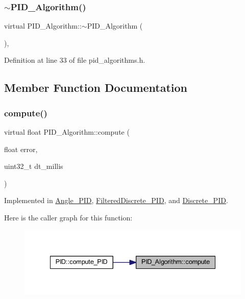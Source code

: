 \subsubsection{\texorpdfstring{$\sim$PID\_Algorithm()}{~PID\_Algorithm()}}
{\footnotesize\ttfamily virtual P\+I\+D\+\_\+\+Algorithm\+::$\sim$\+P\+I\+D\+\_\+\+Algorithm (\begin{DoxyParamCaption}{ }\end{DoxyParamCaption})\hspace{0.3cm}{\ttfamily [inline]}, {\ttfamily [virtual]}}



Definition at line 33 of file pid\+\_\+algorithms.\+h.



\subsection{Member Function Documentation}
\mbox{\label{class_p_i_d___algorithm_a388ec97d23c981e62c3726505688e1f0}} 
\subsubsection{\texorpdfstring{compute()}{compute()}}
{\footnotesize\ttfamily virtual float P\+I\+D\+\_\+\+Algorithm\+::compute (\begin{DoxyParamCaption}\item[{float}]{error,  }\item[{uint32\+\_\+t}]{dt\+\_\+millis }\end{DoxyParamCaption})\hspace{0.3cm}{\ttfamily [pure virtual]}}



Implemented in \mbox{\hyperlink{class_angle___p_i_d_a3816cd7799d40587898c0a3def37ae5e}{Angle\+\_\+\+P\+ID}}, \mbox{\hyperlink{class_filtered_discrete___p_i_d_abbfc49fd3eb46f14f02ef707412193e3}{Filtered\+Discrete\+\_\+\+P\+ID}}, and \mbox{\hyperlink{class_discrete___p_i_d_aa4914b85e73cb5fdfcc5b40e8d0ff23c}{Discrete\+\_\+\+P\+ID}}.

Here is the caller graph for this function\+:
\nopagebreak
\begin{figure}[H]
\begin{center}
\leavevmode
\includegraphics[width=335pt]{class_p_i_d___algorithm_a388ec97d23c981e62c3726505688e1f0_icgraph}
\end{center}
\end{figure}
\mbox{\label{class_p_i_d___algorithm_a5a113c3d88ee8af75af7248fb590f538}} 
